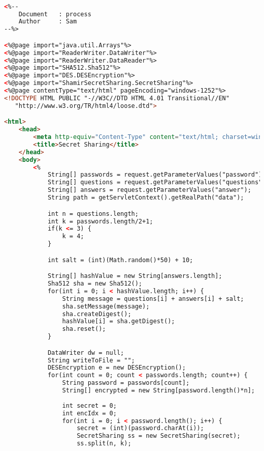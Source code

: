 \begin{lstlisting}[language=html,basicstyle=\tiny,caption=process.jsp]

<%-- 
    Document   : process
    Author     : Sam
--%>

<%@page import="java.util.Arrays"%>
<%@page import="ReaderWriter.DataWriter"%>
<%@page import="ReaderWriter.DataReader"%>
<%@page import="SHA512.Sha512"%>
<%@page import="DES.DESEncryption"%>
<%@page import="ShamirSecretSharing.SecretSharing"%>
<%@page contentType="text/html" pageEncoding="windows-1252"%>
<!DOCTYPE HTML PUBLIC "-//W3C//DTD HTML 4.01 Transitional//EN"
   "http://www.w3.org/TR/html4/loose.dtd">

<html>
    <head>
        <meta http-equiv="Content-Type" content="text/html; charset=windows-1252">
        <title>Secret Sharing</title>
    </head>
    <body>
        <%
            String[] passwords = request.getParameterValues("password");
            String[] questions = request.getParameterValues("questions");
            String[] answers = request.getParameterValues("answer");
            String path = getServletContext().getRealPath("data");

            int n = questions.length;
            int k = passwords.length/2+1;
            if(k <= 3) {
                k = 4;
            }

            int salt = (int)(Math.random()*50) + 10;

            String[] hashValue = new String[answers.length];
            Sha512 sha = new Sha512();
            for(int i = 0; i < hashValue.length; i++) {
                String message = questions[i] + answers[i] + salt;
                sha.setMessage(message);
                sha.createDigest();
                hashValue[i] = sha.getDigest();
                sha.reset();
            }

            DataWriter dw = null;
            String writeToFile = "";
            DESEncryption e = new DESEncryption();
            for(int count = 0; count < passwords.length; count++) {
                String password = passwords[count];
                String[] encrypted = new String[password.length()*n];
                
                int secret = 0;
                int encIdx = 0;
                for(int i = 0; i < password.length(); i++) {
                    secret = (int)(password.charAt(i));
                    SecretSharing ss = new SecretSharing(secret);
                    ss.split(n, k);


\end{lstlisting}
